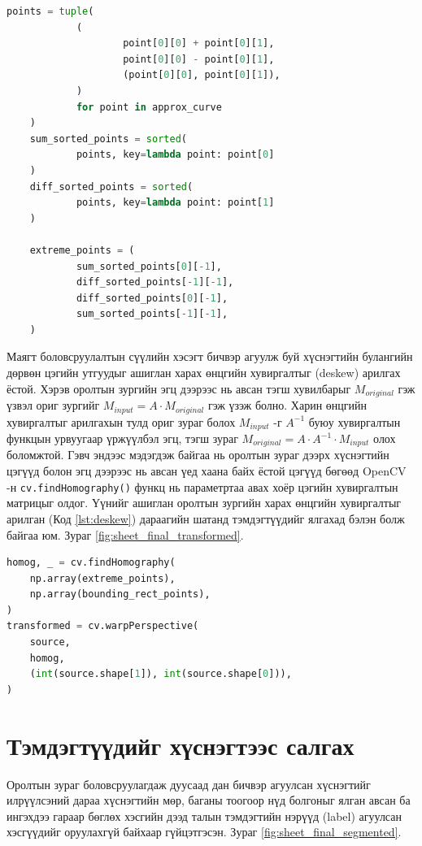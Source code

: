 \begin{lstlisting}[caption={Тоймлосон цэгүүдээс хүснэгтийн булангийн цэгүүдийг олох}, label=extremePoints, language=Python]
	points = tuple(
			(
					point[0][0] + point[0][1],
					point[0][0] - point[0][1],
					(point[0][0], point[0][1]),
			)
			for point in approx_curve
	)
	sum_sorted_points = sorted(
			points, key=lambda point: point[0]
	)
	diff_sorted_points = sorted(
			points, key=lambda point: point[1]
	)
	
	extreme_points = (
			sum_sorted_points[0][-1],
			diff_sorted_points[-1][-1],
			diff_sorted_points[0][-1],
			sum_sorted_points[-1][-1],
	)
	\end{lstlisting}

Маягт боловсруулалтын сүүлийн хэсэгт бичвэр агуулж буй хүснэгтийн булангийн дөрвөн цэгийн утгуудыг ашиглан харах өнцгийн хувиргалтыг (deskew) арилгах ёстой. Хэрэв оролтын зургийн эгц дээрээс нь авсан тэгш хувилбарыг $M_{original}$ гэж үзвэл ориг зургийг $M_{input} = A \cdot M_{original}$ гэж үзэж болно. Харин өнцгийн хувиргалтыг арилгахын тулд ориг зураг болох $M_{input}$ -г $A^{-1}$ буюу хувиргалтын функцын урвуугаар үржүүлбэл эгц, тэгш зураг $M_{original} = A \cdot A^{-1} \cdot M_{input}$ олох боломжтой. Гэвч эндээс мэдэгдэж байгаа нь оролтын зураг дээрх хүснэгтийн цэгүүд болон эгц дээрээс нь авсан үед хаана байх ёстой цэгүүд бөгөөд OpenCV -н \texttt{cv.findHomography()} функц нь параметртаа авах хоёр цэгийн хувиргалтын матрицыг олдог. Үүнийг ашиглан оролтын зургийн харах өнцгийн хувиргалтыг арилган (Код \ref{lst:deskew}) дараагийн шатанд тэмдэгтүүдийг ялгахад бэлэн болж байгаа юм. Зураг \ref{fig:sheet_final_transformed}.

\begin{lstlisting}[caption={Харах өнцгийн хувиргалтыг арилгах}, label={lst:deskew}, language=Python]
homog, _ = cv.findHomography(
	np.array(extreme_points),
	np.array(bounding_rect_points),
)
transformed = cv.warpPerspective(
	source,
	homog,
	(int(source.shape[1]), int(source.shape[0])),
)
\end{lstlisting}

\section{Тэмдэгтүүдийг хүснэгтээс салгах}

Оролтын зураг боловсруулагдаж дуусаад дан бичвэр агуулсан хүснэгтийг илрүүлсэний дараа хүснэгтийн мөр, баганы тоогоор нүд болгоныг ялган авсан ба ингэхдээ гараар бөглөх хэсгийн дээд талын тэмдэгтийн нэрүүд (label) агуулсан хэсгүүдийг оруулахгүй байхаар гүйцэтгэсэн. Зураг \ref{fig:sheet_final_segmented}.

